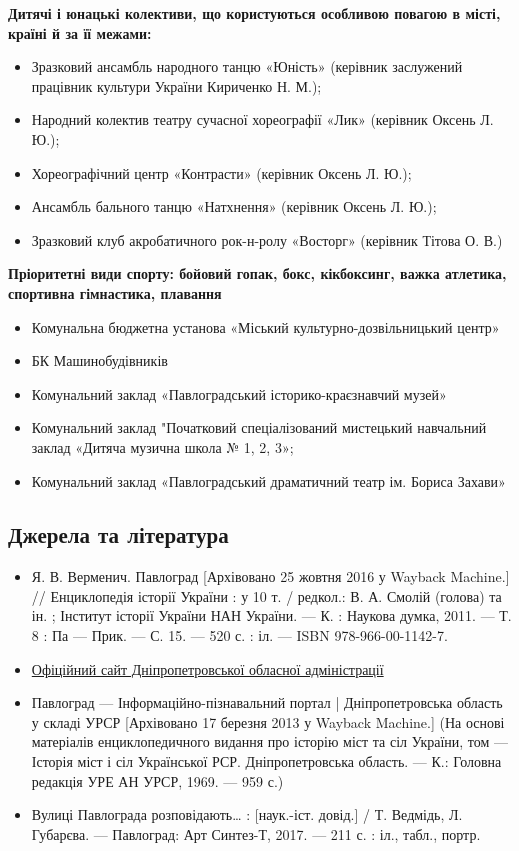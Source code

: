 \textbf{Дитячі і юнацькі колективи, що користуються особливою повагою в місті, країні й за її межами:}
\begin{itemize}
	\item Зразковий ансамбль народного танцю «Юність» (керівник заслужений працівник культури України Кириченко Н. М.);
	\item Народний колектив театру сучасної хореографії «Лик» (керівник Оксень Л. Ю.);
	\item Хореографічний центр «Контрасти» (керівник Оксень Л. Ю.);
	\item Ансамбль бального танцю «Натхнення» (керівник Оксень Л. Ю.);
	\item Зразковий клуб акробатичного рок-н-ролу «Восторг» (керівник Тітова О. В.)
\end{itemize}
	
\textbf{Пріоритетні види спорту: бойовий гопак, бокс, кікбоксинг, важка атлетика, спортивна гімнастика, плавання}
\begin{itemize}
	\item Комунальна бюджетна установа «Міський культурно-дозвільницький центр»
	\item БК Машинобудівників
	\item Комунальний заклад «Павлоградський історико-краєзнавчий музей»
	\item Комунальний заклад "Початковий спеціалізований мистецький навчальний заклад «Дитяча музична школа № 1, 2, 3»;
	\item Комунальний заклад «Павлоградський драматичний театр ім. Бориса Захави»
\end{itemize}

\subsection{Джерела та література}
\begin{itemize}
	\item Я. В. Верменич. Павлоград [Архівовано 25 жовтня 2016 у Wayback Machine.] // Енциклопедія історії України : у 10 т. / редкол.: В. А. Смолій (голова) та ін. ; Інститут історії України НАН України. — К. : Наукова думка, 2011. — Т. 8 : Па — Прик. — С. 15. — 520 с. : іл. — ISBN 978-966-00-1142-7.
	\item {\href{https://pavlogradmrada.dp.gov.ua/}%
		{Офіційний сайт Дніпропетровської обласної адміністрації}}
	\item Павлоград — Інформаційно-пізнавальний портал | Дніпропетровська область у складі УРСР [Архівовано 17 березня 2013 у Wayback Machine.] (На основі матеріалів енциклопедичного видання про історію міст та сіл України, том — Історія міст і сіл Української РСР. Дніпропетровська область. — К.: Головна редакція УРЕ АН УРСР, 1969. — 959 с.)
	\item Вулиці Павлограда розповідають… : [наук.-іст. довід.] / Т. Ведмідь, Л. Губарєва. — Павлоград: Арт Синтез-Т, 2017. — 211 с. : іл., табл., портр.
\end{itemize}